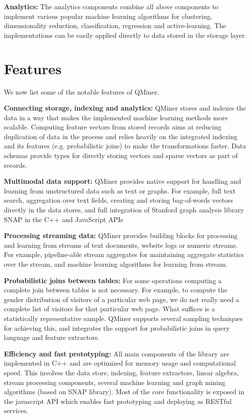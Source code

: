 \documentclass{article} %
\begin{document}
\textbf{Analytics:} The analytics components combine all above components to implement various popular machine learning algorithms for clustering, dimensionality reduction, classification, regression and active-learning. The implementations can be easily applied directly to data stored in the storage layer.


\section{Features}
We now list some of the notable features of QMiner.

\textbf{Connecting storage, indexing and analytics:} QMiner stores and indexes the data in a way that makes the implemented machine learning methods more scalable. Computing feature vectors from stored records aims at reducing duplication of data in the process and relies heavily on the integrated indexing and its features (e.g. probabilistic joins) to make the transformations faster. Data schemas provide types for directly storing vectors and sparse vectors as part of records.

\textbf{Multimodal data support:} QMiner provides native support for handling and learning from unstructured data such as text or graphs. For example, full text search, aggregation over text fields, creating and storing bag-of-words vectors directly in the data stores, and full integration of Stanford graph analysis library SNAP in the C++ and JavaScript APIs

\textbf{Processing streaming data:} QMiner provides building blocks for processing and learning from streams of text documents, website logs or numeric streams. For example, pipeline-able stream aggregates for maintaining aggregate statistics over the stream, and machine learning algorithms for learning from stream.

\textbf{Probabilistic joins between tables:} For some operations computing a complete join between tables is not necessary. For example, to compute the gender distribution of visitors of a particular web page, we do not really need a complete list of visitors for that particular web page. What suffices is a statistically representative sample. QMiner supports several sampling techniques for achieving this, and integrates the support for probabilistic joins in query language and feature extractors.

\textbf{Efficiency and fast prototyping:} All main components of the library are implemented in C++ and are optimized for memory usage and computational speed. This involves the data store, indexing, feature extractors, linear algebra, stream processing components, several machine learning and graph mining algorithms (based on SNAP library). Most of the core functionality is exposed in the javascript API which enables fast prototyping and deploying as RESTful services.
\end{document}
